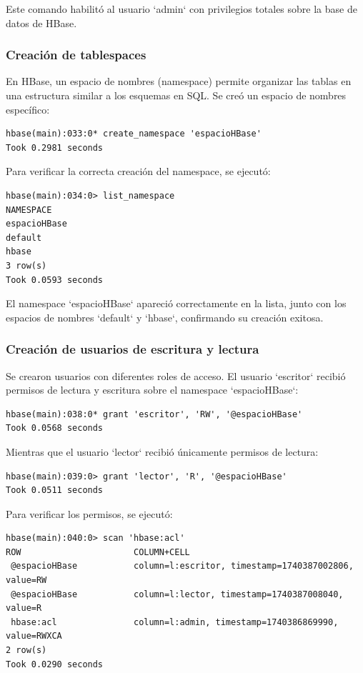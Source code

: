 \documentclass{article}
\begin{document}
Este comando habilitó al usuario `admin` con privilegios totales sobre la base de datos de HBase.

\subsubsection{Creación de tablespaces}

En HBase, un espacio de nombres (namespace) permite organizar las tablas en una estructura similar a los esquemas en SQL. Se creó un espacio de nombres específico:

\begin{lstlisting}[style=bashStyle]
hbase(main):033:0* create_namespace 'espacioHBase'
Took 0.2981 seconds
\end{lstlisting}

Para verificar la correcta creación del namespace, se ejecutó:

\begin{lstlisting}[style=bashStyle]
hbase(main):034:0> list_namespace
NAMESPACE
espacioHBase
default
hbase
3 row(s)
Took 0.0593 seconds
\end{lstlisting}

El namespace `espacioHBase` apareció correctamente en la lista, junto con los espacios de nombres `default` y `hbase`, confirmando su creación exitosa.


\subsubsection{Creación de usuarios de escritura y lectura}

Se crearon usuarios con diferentes roles de acceso. El usuario `escritor` recibió permisos de lectura y escritura sobre el namespace `espacioHBase`:

\begin{lstlisting}[style=bashStyle]
hbase(main):038:0* grant 'escritor', 'RW', '@espacioHBase'
Took 0.0568 seconds
\end{lstlisting}

Mientras que el usuario `lector` recibió únicamente permisos de lectura:

\begin{lstlisting}[style=bashStyle]
hbase(main):039:0> grant 'lector', 'R', '@espacioHBase'
Took 0.0511 seconds
\end{lstlisting}

Para verificar los permisos, se ejecutó:

\begin{lstlisting}[style=bashStyle]
hbase(main):040:0> scan 'hbase:acl'
ROW                      COLUMN+CELL
 @espacioHBase           column=l:escritor, timestamp=1740387002806, value=RW
 @espacioHBase           column=l:lector, timestamp=1740387008040, value=R
 hbase:acl               column=l:admin, timestamp=1740386869990, value=RWXCA
2 row(s)
Took 0.0290 seconds
\end{lstlisting}
\end{document}
